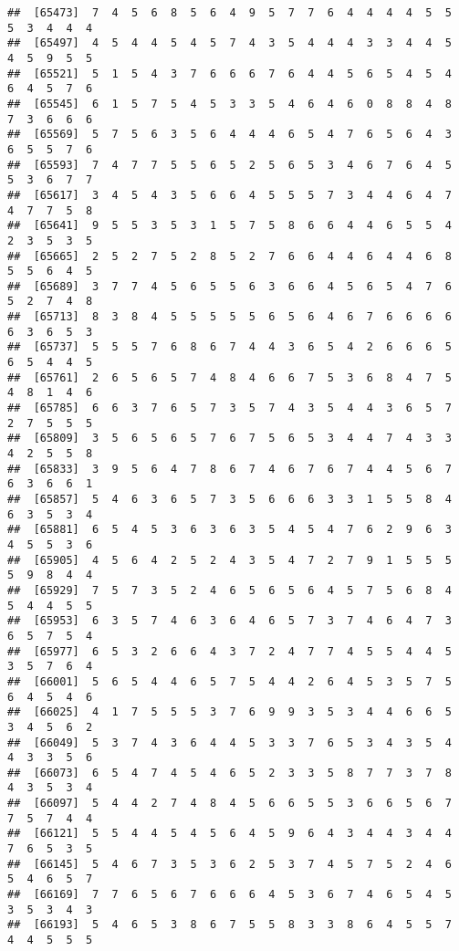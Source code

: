 \documentclass[
]{book}
\begin{document}
\begin{verbatim}
##  [65473]  7  4  5  6  8  5  6  4  9  5  7  7  6  4  4  4  4  5  5  5  3  4  4  4
##  [65497]  4  5  4  4  5  4  5  7  4  3  5  4  4  4  3  3  4  4  5  4  5  9  5  5
##  [65521]  5  1  5  4  3  7  6  6  6  7  6  4  4  5  6  5  4  5  4  6  4  5  7  6
##  [65545]  6  1  5  7  5  4  5  3  3  5  4  6  4  6  0  8  8  4  8  7  3  6  6  6
##  [65569]  5  7  5  6  3  5  6  4  4  4  6  5  4  7  6  5  6  4  3  6  5  5  7  6
##  [65593]  7  4  7  7  5  5  6  5  2  5  6  5  3  4  6  7  6  4  5  5  3  6  7  7
##  [65617]  3  4  5  4  3  5  6  6  4  5  5  5  7  3  4  4  6  4  7  4  7  7  5  8
##  [65641]  9  5  5  3  5  3  1  5  7  5  8  6  6  4  4  6  5  5  4  2  3  5  3  5
##  [65665]  2  5  2  7  5  2  8  5  2  7  6  6  4  4  6  4  4  6  8  5  5  6  4  5
##  [65689]  3  7  7  4  5  6  5  5  6  3  6  6  4  5  6  5  4  7  6  5  2  7  4  8
##  [65713]  8  3  8  4  5  5  5  5  5  6  5  6  4  6  7  6  6  6  6  6  3  6  5  3
##  [65737]  5  5  5  7  6  8  6  7  4  4  3  6  5  4  2  6  6  6  5  6  5  4  4  5
##  [65761]  2  6  5  6  5  7  4  8  4  6  6  7  5  3  6  8  4  7  5  4  8  1  4  6
##  [65785]  6  6  3  7  6  5  7  3  5  7  4  3  5  4  4  3  6  5  7  2  7  5  5  5
##  [65809]  3  5  6  5  6  5  7  6  7  5  6  5  3  4  4  7  4  3  3  4  2  5  5  8
##  [65833]  3  9  5  6  4  7  8  6  7  4  6  7  6  7  4  4  5  6  7  6  3  6  6  1
##  [65857]  5  4  6  3  6  5  7  3  5  6  6  6  3  3  1  5  5  8  4  6  3  5  3  4
##  [65881]  6  5  4  5  3  6  3  6  3  5  4  5  4  7  6  2  9  6  3  4  5  5  3  6
##  [65905]  4  5  6  4  2  5  2  4  3  5  4  7  2  7  9  1  5  5  5  5  9  8  4  4
##  [65929]  7  5  7  3  5  2  4  6  5  6  5  6  4  5  7  5  6  8  4  5  4  4  5  5
##  [65953]  6  3  5  7  4  6  3  6  4  6  5  7  3  7  4  6  4  7  3  6  5  7  5  4
##  [65977]  6  5  3  2  6  6  4  3  7  2  4  7  7  4  5  5  4  4  5  3  5  7  6  4
##  [66001]  5  6  5  4  4  6  5  7  5  4  4  2  6  4  5  3  5  7  5  6  4  5  4  6
##  [66025]  4  1  7  5  5  5  3  7  6  9  9  3  5  3  4  4  6  6  5  3  4  5  6  2
##  [66049]  5  3  7  4  3  6  4  4  5  3  3  7  6  5  3  4  3  5  4  4  3  3  5  6
##  [66073]  6  5  4  7  4  5  4  6  5  2  3  3  5  8  7  7  3  7  8  4  3  5  3  4
##  [66097]  5  4  4  2  7  4  8  4  5  6  6  5  5  3  6  6  5  6  7  7  5  7  4  4
##  [66121]  5  5  4  4  5  4  5  6  4  5  9  6  4  3  4  4  3  4  4  7  6  5  3  5
##  [66145]  5  4  6  7  3  5  3  6  2  5  3  7  4  5  7  5  2  4  6  5  4  6  5  7
##  [66169]  7  7  6  5  6  7  6  6  6  4  5  3  6  7  4  6  5  4  5  3  5  3  4  3
##  [66193]  5  4  6  5  3  8  6  7  5  5  8  3  3  8  6  4  5  5  7  4  4  5  5  5

\end{verbatim}
\end{document}
